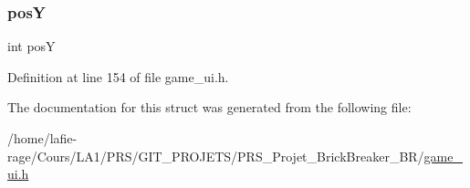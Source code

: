 \subsubsection{\texorpdfstring{posY}{posY}}
{\footnotesize\ttfamily int posY}



Definition at line 154 of file game\+\_\+ui.\+h.



The documentation for this struct was generated from the following file\+:\begin{DoxyCompactItemize}
\item 
/home/lafie-\/rage/\+Cours/\+L\+A1/\+P\+R\+S/\+G\+I\+T\+\_\+\+P\+R\+O\+J\+E\+T\+S/\+P\+R\+S\+\_\+\+Projet\+\_\+\+Brick\+Breaker\+\_\+\+B\+R/\hyperlink{game__ui_8h}{game\+\_\+ui.\+h}\end{DoxyCompactItemize}
